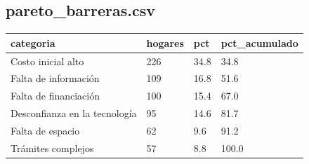 \subsection*{pareto\_barreras.csv}
{\footnotesize\begin{longtable}{@{}p{}lll@{}}
\toprule
categoria & hogares & pct & pct\_acumulado \\
\midrule\endhead
Costo inicial alto & 226 & 34.8 & 34.8 \\
Falta de información & 109 & 16.8 & 51.6 \\
Falta de financiación & 100 & 15.4 & 67.0 \\
Desconfianza en la tecnología & 95 & 14.6 & 81.7 \\
Falta de espacio & 62 & 9.6 & 91.2 \\
Trámites complejos & 57 & 8.8 & 100.0 \\
\bottomrule
\end{longtable}}
